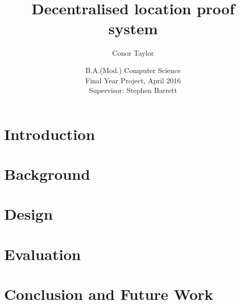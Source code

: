 \documentclass[12pt]{report}
\title{Decentralised location proof system}
\author{Conor Taylor}
\date{
	B.A.(Mod.) Computer Science\\
	Final Year Project, April 2016\\
	Supervisor: Stephen Barrett
}
\begin{document}
\maketitle

\tableofcontents
\newpage

\listoffigures
\newpage

\chapter{Introduction} \label{ch:introduction}


\chapter{Background} \label{ch:background}


\chapter{Design} \label{ch:design}


\chapter{Evaluation} \label{ch:evaluation}


\chapter{Conclusion and Future Work} \label{ch:conclusion}

\end{document}
